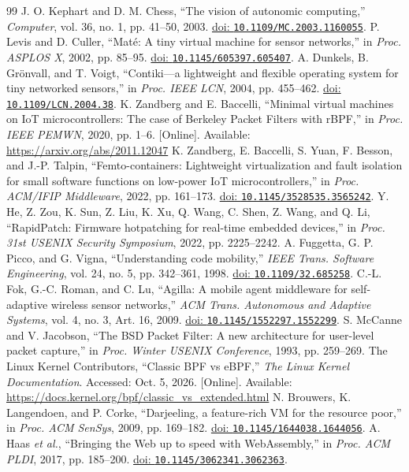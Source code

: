 \documentclass[conference,letterpaper]{IEEEtran}
\newcommand{\doi}[1]{\href{https://doi.org/#1}{doi: \nolinkurl{#1}}}
\begin{document}
\balance
\begin{thebibliography}{99}
 J. O. Kephart and D. M. Chess, ``The vision of autonomic computing,'' \emph{Computer}, vol. 36, no. 1, pp. 41--50, 2003. \doi{10.1109/MC.2003.1160055}.
 P. Levis and D. Culler, ``Mat\'e: A tiny virtual machine for sensor networks,'' in \emph{Proc. ASPLOS X}, 2002, pp. 85--95. \doi{10.1145/605397.605407}.
 A. Dunkels, B. Gr\"onvall, and T. Voigt, ``Contiki---a lightweight and flexible operating system for tiny networked sensors,'' in \emph{Proc. IEEE LCN}, 2004, pp. 455--462. \doi{10.1109/LCN.2004.38}.
 K. Zandberg and E. Baccelli, ``Minimal virtual machines on IoT microcontrollers: The case of Berkeley Packet Filters with rBPF,'' in \emph{Proc. IEEE PEMWN}, 2020, pp. 1--6. [Online]. Available: \url{https://arxiv.org/abs/2011.12047}
 K. Zandberg, E. Baccelli, S. Yuan, F. Besson, and J.-P. Talpin, ``Femto-containers: Lightweight virtualization and fault isolation for small software functions on low-power IoT microcontrollers,'' in \emph{Proc. ACM/IFIP Middleware}, 2022, pp. 161--173. \doi{10.1145/3528535.3565242}.
 Y. He, Z. Zou, K. Sun, Z. Liu, K. Xu, Q. Wang, C. Shen, Z. Wang, and Q. Li, ``RapidPatch: Firmware hotpatching for real-time embedded devices,'' in \emph{Proc. 31st USENIX Security Symposium}, 2022, pp. 2225--2242.
 A. Fuggetta, G. P. Picco, and G. Vigna, ``Understanding code mobility,'' \emph{IEEE Trans. Software Engineering}, vol. 24, no. 5, pp. 342--361, 1998. \doi{10.1109/32.685258}.
 C.-L. Fok, G.-C. Roman, and C. Lu, ``Agilla: A mobile agent middleware for self-adaptive wireless sensor networks,'' \emph{ACM Trans. Autonomous and Adaptive Systems}, vol. 4, no. 3, Art. 16, 2009. \doi{10.1145/1552297.1552299}.
 S. McCanne and V. Jacobson, ``The BSD Packet Filter: A new architecture for user-level packet capture,'' in \emph{Proc. Winter USENIX Conference}, 1993, pp. 259--269.
 The Linux Kernel Contributors, ``Classic BPF vs eBPF,'' \emph{The Linux Kernel Documentation}. Accessed: Oct. 5, 2026. [Online]. Available: \url{https://docs.kernel.org/bpf/classic_vs_extended.html}
 N. Brouwers, K. Langendoen, and P. Corke, ``Darjeeling, a feature-rich VM for the resource poor,'' in \emph{Proc. ACM SenSys}, 2009, pp. 169--182. \doi{10.1145/1644038.1644056}.
 A. Haas \emph{et al.}, ``Bringing the Web up to speed with WebAssembly,'' in \emph{Proc. ACM PLDI}, 2017, pp. 185--200. \doi{10.1145/3062341.3062363}.

\end{thebibliography}
\end{document}
